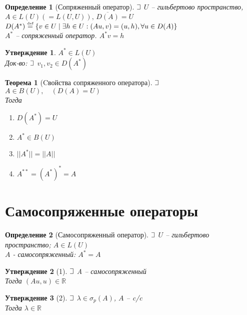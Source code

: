 \documentclass{article}
\theoremstyle{truestyle}
\newtheorem*{defenition}{Определение}
\newtheorem*{theorem}{Теорема}
\newtheorem*{utv}{Утверждение}
\newcommand{\eqdef}{\overset{\text{\tiny def}}=}
\def\letus{%
	\mathord{\setbox0=\hbox{$\exists$}%
		\hbox{\kern 0.125\wd0%
			\vbox to \ht0{%
				\hrule width 0.75\wd0%
				\vfill%
				\hrule width 0.75\wd0}%
			\vrule height \ht0%
			\kern 0.125\wd0}%
	}%
}
\begin{document}
\begin{defenition}[Сопряженный оператор]
  $\letus$ $U$ -- гильбертово пространство, $A \in L(U) (= L(U, U)), \, \overline{D(A)} = U$\\
  $D(A^*) \eqdef \{v \in U \mid \exists h \in U: (Au, v) = (u,h), \forall u \in D(A)\}$\\
  $A^*$ -- сопряженный оператор. $A^*v=h$
\end{defenition}

\begin{utv}
  $A^{*} \in L(U)$\\
  Док-во:
  $\letus$ $v_1, v_2 \in D(A^*) \ $
\end{utv}

\begin{theorem}[Cвойства сопряженного оператора]
  $\letus$ $A \in B(U), \quad (D(A) = U)$\\
  Тогда\begin{minipage}[t]{0.8\linewidth}\begin{enumerate}[itemsep=1mm]
    \item $D(A^*) = U$
    \item $A^* \in B(U)$
    \item $||A^*|| = ||A||$
    \item $A^{**} = (A^*)^* = A$
  \end{enumerate}\end{minipage}
\end{theorem}

\section*{Самосопряженные операторы}

\begin{defenition}[Самосопряженный оператор]
$\letus$ $U$ -- гильбертово пространство; $A \in L(U)$ \\
$A$ - самосопряженный: $A^* = A$
\end{defenition}

\begin{utv}[1]
  $\letus$ A -- самосопряженный\\
  Тогда $(Au, u) \in \mathbb{R}$
\end{utv}

\begin{utv}[2]
  $\letus$ $\lambda \in \sigma_p(A)$, $A$ -- c/c\\
  Тогда $\lambda \in \mathbb{R}$
\end{utv}
\end{document}
